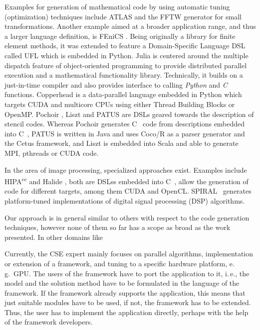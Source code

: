 \documentclass[onecolumn]{svjour3}
\newcommand{\CPP}{C\nolinebreak[4]\hspace{-.05em}\raisebox{.3ex}{\relsize{-1}{++}}~}
\newcommand{\hipacc}{HIPA\hspace{-0.1em}\textsuperscript{cc}}
\begin{document}
Examples for generation of mathematical code by using automatic tuning (optimization) techniques include ATLAS \cite{Whaley00automatedempirical} and the FFTW generator \cite{Frigo:1999:FFT:301618.301661} for small transformations.
Another example aimed at a broader application range, and thus a larger language definition, is FEniCS \cite{fenics:book}.
Being originally a library for finite element methods, it was extended to feature a Domain-Specific Language \ac{DSL} called UFL which is embedded in Python.
Julia \cite{2012arXiv1209.5145B} is centered around the multiple dispatch feature of object-oriented programming to provide distributed parallel execution and a mathematical functionality library.
Technically, it builds on a just-in-time compiler and also provides interface to calling \textit{Python} and \textit{C} functions.
Copperhead \cite{Catanzaro:2011:CCE:1941553.1941562} is a data-parallel language embedded in Python which targets CUDA and multicore CPUs using either Thread Building Blocks or OpenMP.
Pochoir \cite{tang2011pochoir}, Liszt \cite{devito2011liszt} and PATUS \cite{christen2011patus} are \acp{DSL} geared towards the description of stencil codes.
Whereas Pochoir generates \CPP{} code from descriptions embedded into \CPP{}, PATUS is written in Java and uses Coco/R as a parser generator and the Cetus framework, and Liszt is embedded into Scala and able to generate MPI, pthreads or CUDA code.

In the area of image processing, specialized approaches exist.
Examples include \hipacc{} \cite{MHTKE12a,MHTK12} and Halide \cite{Ragan-Kelley:2013:HLC:2491956.2462176}, both are \acp{DSL}s embedded into \CPP{}, allow the generation of code for different targets, among them CUDA and OpenCL. SPIRAL~\cite{puschel2004spiral,puschel2005spiral} generates platform-tuned implementations of digital signal processing (DSP) algorithms.


Our approach is in general similar to others with respect to the code generation techniques, however none of them so far has a scope as broad as the work presented. In other domains like 


Currently, the CSE expert mainly focuses on parallel algorithms, implementation or extension of a framework, and tuning to a specific hardware platform, e.\,g.\ GPU. 
The users of the framework have to port the application to it, i.\,e., the model and the solution method have to be formulated in the language of the framework. If the framework already supports the
application, this means that just suitable modules have to be used, if not, the framework has to be extended. 
Thus, the user has to implement the application directly,
perhaps with the help of the framework developers. 
\end{document}
